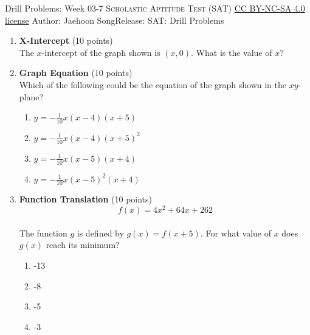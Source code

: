 \newpage\handout
{Drill Problems: Week 03-7}
{\textsc{Scholastic Aptitude Test (SAT)}}
{\href{https://creativecommons.org/licenses/by-nc-sa/4.0/}{CC BY-NC-SA 4.0 license}}
{Author: Jaehoon Song}{Release: \generatedOn}
{SAT: Drill Problems}


\begin{enumerate}
  \item \textbf{X-Intercept} (10 points)\\
  The $x$-intercept of the graph shown is $(x, 0)$. What is the value of $x$?
  \begin{subanswer}
  \end{subanswer}
  

  \newpage


  \item \textbf{Graph Equation} (10 points)\\
  Which of the following could be the equation of the graph shown in the $xy$-plane?
  \begin{enumerate}[label=(\Alph*)]
    \item $y=-\frac{1}{10} x(x-4)(x+5)$
    \item $y=-\frac{1}{10} x(x-4)(x+5)^{2}$
    \item $y=-\frac{1}{10} x(x-5)(x+4)$
    \item $y=-\frac{1}{10} x (x-5)^{2}(x+4)$
  \end{enumerate}
  \begin{subanswer}
  \end{subanswer}


  \item \textbf{Function Translation} (10 points)\\
  $$f(x)=4 x^{2}+64 x+262$$\\
  The function $g$ is defined by $g(x)=f(x+5)$. For what value of $x$ does $g(x)$ reach its minimum?
  \begin{enumerate}[label=(\Alph*)]
    \item -13
    \item -8
    \item -5
    \item -3
  \end{enumerate}
  \begin{subanswer}
  \end{subanswer}



\end{enumerate}
